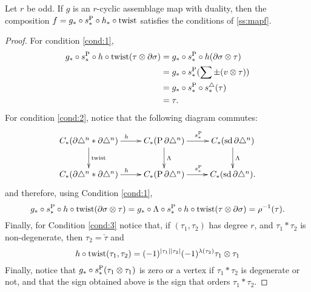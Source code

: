 \begin{proposition} Let $r$ be odd.
	If $g$ is an $r$-cyclic assemblage map with duality, then the composition $f = g_*\circ s_*^{\operatorname{P}}\circ h_*\circ \mathrm{twist}$ satisfies the conditions of \cref{ss:mapf}.
\end{proposition}
\begin{proof}
	For condition \ref{cond:1},
	\begin{align*}
		g_*\circ s_*^{\operatorname{P}}\circ h \circ \mathrm{twist}(\tau\otimes \partial\sigma)
		&= g_*\circ s_*^{\operatorname{P}}\circ h (\partial\sigma\otimes \tau)\\
		&= g_*\circ s_*^{\operatorname{P}}(\sum \pm (v\otimes\tau)) \\
		&= g_*\circ s_*^{\operatorname{P}}\circ s_*^{\triangle}(\tau) \\
		&= \tau.
	\end{align*}
	For condition \ref{cond:2}, notice that the following diagram commutes:
	\[\xymatrix{
		C_*(\partial \simplex^n*\partial\simplex^n)\ar[r]^h\ar[d]^{\text{twist}} &C_*(\Psd \partial \simplex^n) \ar[r]^{s_*^{\Psd}}\ar[d]^{\alex}& C_*(\sd \partial \simplex^n)\ar[d]^{\alex}\\
		C_*(\partial \simplex^n*\partial\simplex^n)\ar[r]^h &C_*(\Psd \partial \simplex^n) \ar[r]^{s_*^{\Psd}}& C_*(\sd \partial \simplex^n).
	}\]
	and therefore, using Condition \eqref{cond:1},
	\[
	g_*\circ s_*^{\operatorname{P}}\circ h \circ \mathrm{twist}(\partial\sigma\otimes \tau) = g_*\circ \Lambda\circ s_*^{\operatorname{P}}\circ h \circ \mathrm{twist}(\tau\otimes \partial\sigma) = \rho^{-1}(\tau).
	\]
	Finally, for Condition \ref{cond:3} notice that, if $(\tau_1,\tau_2)$ has degree $r$, and $\tau_1*\tau_2$ is non-degenerate, then $\tau_2 = \check{\tau}$ and
	\[
	h\circ\operatorname{twist}(\tau_1,\tau_2) = (-1)^{|\tau_1||\tau_2|}(-1)^{\lambda(\tau_2)}\tau_1\otimes \tau_1
	\]
	Finally, notice that $g_*\circ s_*^{\operatorname{P}}(\tau_1\otimes \tau_1)$ is zero or a vertex if $\tau_1*\tau_2$ is degenerate or not, and that the sign obtained above is the sign that orders $\tau_1*\tau_2$.
\end{proof}


